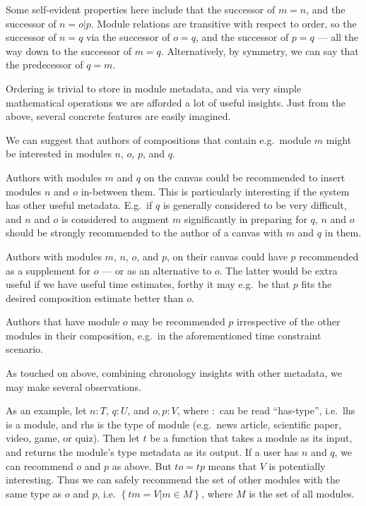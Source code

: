 \documentclass{article}
\begin{document}
\begin{multicols}{2}
Some self-evident properties here include that the successor of $m = n$, and 
the successor of $n = o \vert p$. Module relations are transitive with respect 
to order, so the successor of $n = q$ via the successor of $o = q$, and the 
successor of $p = q$ --- all the way down to the successor of $m = q$. 
Alternatively, by symmetry, we can say that the predecessor of $q = m$.

Ordering is trivial to store in module metadata, and via very simple 
mathematical operations we are afforded a lot of useful insights. Just from 
the above, several concrete features are easily imagined.

\begin{itemize*}
  \item We can suggest that authors of compositions that contain e.g.\ module 
$m$ might be interested in modules $n$, $o$, $p$, and $q$.
   \item Authors with modules $m$ and $q$ on the canvas could be recommended 
   to insert modules $n$ and $o$ in-between them. This is particularly 
   interesting if the system has other useful metadata. E.g.\ if $q$ is 
   generally considered to be very difficult, and $n$ and $o$ is considered to 
   augment $m$ significantly in preparing for $q$, $n$ and $o$ should be 
   strongly recommended to the author of a canvas with $m$ and $q$ in them.
   \item Authors with modules $m$, $n$, $o$, and $p$, on their canvas could 
   have $p$ recommended as a supplement for $o$ --- or as an alternative to 
   $o$. The latter would be extra useful if we have useful time estimates, 
   forthy it may e.g.\ be that $p$ fits the desired composition estimate 
   better than $o$.
   \item Authors that have module $o$ may be recommended $p$ irrespective of 
   the other modules in their composition, e.g.\ in the aforementioned time 
   constraint  scenario.
\end{itemize*}

As touched on above, combining chronology insights with other metadata, we may 
make several observations.

As an example, let $n : T$, $q : U$, and $o, p : V$, where $:$ can be read 
``has-type'', i.e.\ lhs is a module, and rhs is the type of module (e.g.\ news 
article, scientific paper, video, game, or quiz). Then let $t$ be a function 
that takes a module as its input, and returns the module's type metadata as 
its output. If a user has $n$ and $q$, we can recommend $o$ and $p$ as above. 
But $t o = t p$ means that $V$ is potentially interesting. Thus we can safely 
recommend the set of other modules with the same type as $o$ and $p$, i.e. 
$\left\{ {t m = V \vert m \in M} \right\}$, where $M$ is the set of all 
modules.


\end{multicols}
\end{document}
